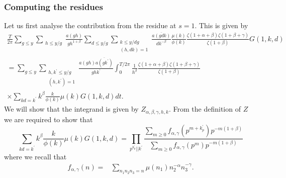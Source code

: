 \documentclass[oneside, 12pt]{amsart}
\theoremstyle{definition}
\newcommand{\ol}{\overline}
\newcommand{\leqs}{\leqslant }
\newcommand{\geqs}{\geqslant }
\newcommand{\ben}{\begin{equation}}
\newcommand{\een}{\end{equation} }
\begin{document}
\subsubsection{Computing the residues} 
Let us first analyse the contribution from the residue at $s=1$. This is given by
\begin{multline*}
   \frac{T}{2\pi}
   \sum_{g\leqs y}\sum_{\substack{h\leqs y/g}}\frac{a(gh)}{gh^{1+\beta}}\sum_{d\leqs y/g}
   \sum_{\substack{k\leqs y/dg\\(h,dk)=1}}\frac{\ol{a(gdk)}}{dk^{-\beta}}\frac{\mu(k)}{\phi(k)}
   \frac{\zeta(1+\alpha+\beta)\zeta(1+\beta+\gamma)}{\zeta(1+\beta)}G(1,k,d) 
   \\
 =    \sum_{g\leqs y}\sum_{\substack{h,k^\prime\leqs y/g\\(h,k^\prime)=1}}\frac{a(gh)\ol{a(gk^\prime)}}{ghk^\prime}
          \int_0^{T/2\pi} \frac{1}{h^\beta}  \frac{\zeta(1+\alpha+\beta)\zeta(1+\beta+\gamma)}{\zeta(1+\beta)}  \\
     \times     \sum_{kd=k^\prime} k^{\beta}\frac{k}{\phi(k)}\mu(k) G(1,k,d) dt.
\end{multline*}
We will show that the integrand is given by $Z_{\alpha,\beta,\gamma,h,k}$. From the definition of $Z$ we are required to show that 
\ben
\label{identity}
\sum_{kd=k^\prime} k^{\beta}\frac{k}{\phi(k)}\mu(k) G(1,k,d)
=
\prod_{p^{{k_p^\prime}} || k^\prime}\frac{\sum_{m\geqs 0}f_{\alpha,\gamma}(p^{m+{k_p^\prime}})p^{-m(1+\beta)}}{\sum_{m\geqs 0}f_{\alpha,\gamma}(p^{m})p^{-m(1+\beta)}}
\een
where we recall that 
\begin{align*}
f_{\alpha,\gamma}(n) = & \sum_{n_1n_2n_3=n}\mu(n_1)n_2^{-\alpha}n_3^{-\gamma}.
\end{align*}
\end{document}
